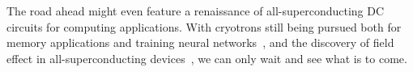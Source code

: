 %


The road ahead might even feature a renaissance of all-superconducting DC circuits for computing applications.
%
With cryotrons still being pursued both for memory applications and training neural networks~\cite{toomeyBridgingGapNanowires2019,onenDesignCharacterizationSuperconducting2020}, and the discovery of field effect in all-superconducting devices~\cite{desimoniMetallicSupercurrentFieldeffect2018,paolucciMagnetotransportExperimentsFully2019}, we can only wait and see what is to come.


